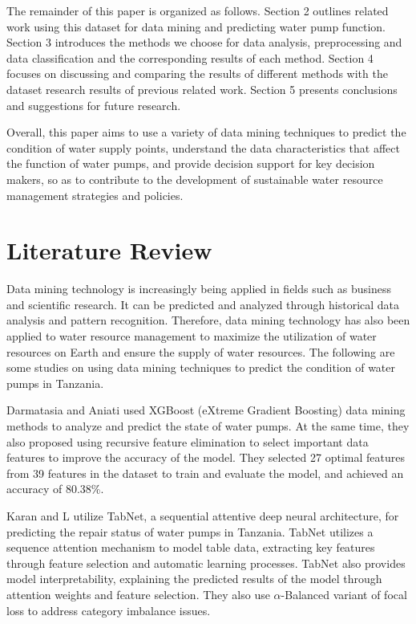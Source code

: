 \documentclass[conference]{IEEEtran}
\begin{document}
The remainder of this paper is organized as follows. Section 2 outlines related work using this dataset for data mining and predicting water pump function. Section 3 introduces the methods we choose for data analysis, preprocessing and data classification and the corresponding results of each method. Section 4 focuses on discussing and comparing the results of different methods with the dataset research results of previous related work. Section 5 presents conclusions and suggestions for future research.

Overall, this paper aims to use a variety of data mining techniques to predict the condition of water supply points, understand the data characteristics that affect the function of water pumps, and provide decision support for key decision makers, so as to contribute to the development of sustainable water resource management strategies and policies.


\section{Literature Review}

Data mining technology is increasingly being applied in fields such as business and scientific research. It can be predicted and analyzed through historical data analysis and pattern recognition. Therefore, data mining technology has also been applied to water resource management to maximize the utilization of water resources on Earth and ensure the supply of water resources. The following are some studies on using data mining techniques to predict the condition of water pumps in Tanzania.

Darmatasia and Aniati \cite{b1} used XGBoost (eXtreme Gradient Boosting) data mining methods to analyze and predict the state of water pumps. At the same time, they also proposed using recursive feature elimination to select important data features to improve the accuracy of the model. They selected 27 optimal features from 39 features in the dataset to train and evaluate the model, and achieved an accuracy of 80.38\%.

Karan and L \cite{b2} utilize TabNet, a sequential attentive deep neural architecture, for predicting the repair status of water pumps in Tanzania. TabNet utilizes a sequence attention mechanism to model table data, extracting key features through feature selection and automatic learning processes. TabNet also provides model interpretability, explaining the predicted results of the model through attention weights and feature selection. They also use $\alpha$-Balanced variant of focal loss to address category imbalance issues.
\end{document}
